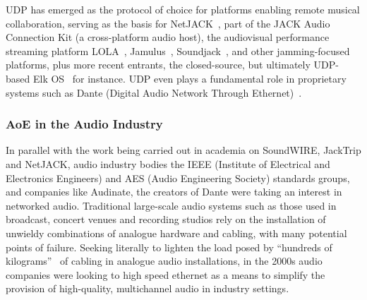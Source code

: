 UDP has emerged as the protocol of choice for platforms enabling remote musical
collaboration, serving as the basis for NetJACK~\citep{carot_netjack_2009}, part
of the JACK Audio Connection Kit (a cross-platform audio host), the audiovisual
performance streaming platform LOLA~\citep{drioli_networked_2013},
Jamulus~\citep{fischer_case_2015}, Soundjack~\citep{renaud_networked_2007}, and
other jamming-focused platforms, plus more recent entrants, the closed-source,
but ultimately UDP-based Elk OS~\citep{turchet_elk_2021} for instance.
UDP even plays a fundamental role in proprietary systems such as Dante (Digital
Audio Network Through Ethernet)~\citep{dante_what_2022}.

\subsubsection{AoE in the Audio Industry}

In parallel with the work being carried out in academia on SoundWIRE, JackTrip
and NetJACK, audio industry bodies \textemdash{} the IEEE (Institute of
Electrical and Electronics Engineers) and AES (Audio Engineering Society)
standards groups, and companies like Audinate, the creators of Dante
\textemdash{} were taking an interest in networked audio.
Traditional large-scale audio systems such as those used in broadcast, concert
venues and recording studios rely on the installation of unwieldy combinations
of analogue hardware and cabling, with many potential points of failure.
Seeking literally to lighten the load posed by ``hundreds of
kilograms''~\citep{bakker_introduction_2014} of cabling in analogue audio
installations, in the 2000s audio companies were looking to high speed ethernet
as a means to simplify the provision of high-quality, multichannel audio in
industry settings.

